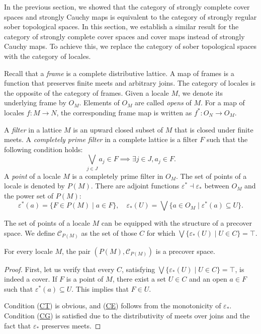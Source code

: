 \documentclass[pdflatex,sn-mathphys-num]{sn-jnl}
\newcommand{\axref}[1]{(\hyperref[ax:#1]{#1})}
\theoremstyle{definition}
\theoremstyle{remark}
\numberwithin{figure}{section}
\begin{document}
In the previous section, we showed that the category of strongly complete cover spaces and strongly Cauchy maps is equivalent to the category of strongly regular sober topological spaces.
In this section, we establish a similar result for the category of strongly complete cover spaces and cover maps instead of strongly Cauchy maps.
To achieve this, we replace the category of sober topological spaces with the category of locales.

Recall that a \emph{frame} is a complete distributive lattice.
A map of frames is a function that preserves finite meets and arbitrary joins.
The category of locales is the opposite of the category of frames.
Given a locale $M$, we denote its underlying frame by $O_M$.
Elements of $O_M$ are called \emph{opens} of $M$.
For a map of locales $f : M \to N$, the corresponding frame map is written as $f^* : O_N \to O_M$.

A \emph{filter} in a lattice $M$ is an upward closed subset of $M$ that is closed under finite meets.
A \emph{completely prime filter} in a complete lattice is a filter $F$ such that the following condition holds:
\[ \bigvee_{j \in J} a_j \in F \implies \exists j \in J, a_j \in F. \]
A \emph{point} of a locale $M$ is a completely prime filter in $O_M$.
The set of points of a locale is denoted by $P(M)$.
There are adjoint functions $\varepsilon^* \dashv \varepsilon_*$ between $O_M$ and the power set of $P(M)$:
\[ \varepsilon^*(a) = \{ F \in P(M) \mid a \in F \}, \quad \varepsilon_*(U) = \bigvee \{ a \in O_M \mid \varepsilon^*(a) \subseteq U \}. \]

The set of points of a locale $M$ can be equipped with the structure of a precover space.
We define $\mathcal{C}_{P(M)}$ as the set of those $C$ for which $\bigvee \{ \varepsilon_*(U) \mid U \in C \} = \top$.

\begin{prop}
For every locale $M$, the pair $(P(M),\mathcal{C}_{P(M)})$ is a precover space.
\end{prop}
\begin{proof}
First, let us verify that every $C$, satisfying $\bigvee \{ \varepsilon_*(U) \mid U \in C \} = \top$, is indeed a cover.
If $F$ is a point of $M$, there exist a set $U \in C$ and an open $a \in F$ such that $\varepsilon^*(a) \subseteq U$.
This implies that $F \in U$.

Condition \axref{CT} is obvious, and \axref{CE} follows from the monotonicity of $\varepsilon_*$.
Condition \axref{CG} is satisfied due to the distributivity of meets over joins and the fact that $\varepsilon_*$ preserves meets.
\end{proof}
\end{document}
